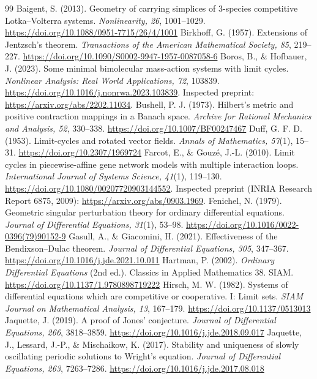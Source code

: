 \begin{thebibliography}{99}
 Baigent, S. (2013). Geometry of carrying simplices of 3-species competitive Lotka--Volterra systems. \emph{Nonlinearity, 26}, 1001--1029. \url{https://doi.org/10.1088/0951-7715/26/4/1001}
 Birkhoff, G. (1957). Extensions of Jentzsch's theorem. \emph{Transactions of the American Mathematical Society, 85}, 219--227. \url{https://doi.org/10.1090/S0002-9947-1957-0087058-6}
 Boros, B., \& Hofbauer, J. (2023). Some minimal bimolecular mass-action systems with limit cycles. \emph{Nonlinear Analysis: Real World Applications, 72}, 103839. \url{https://doi.org/10.1016/j.nonrwa.2023.103839}. Inspected preprint: \url{https://arxiv.org/abs/2202.11034}.
 Bushell, P. J. (1973). Hilbert's metric and positive contraction mappings in a Banach space. \emph{Archive for Rational Mechanics and Analysis, 52}, 330--338. \url{https://doi.org/10.1007/BF00247467}
 Duff, G. F. D. (1953). Limit-cycles and rotated vector fields. \emph{Annals of Mathematics, 57}(1), 15--31. \url{https://doi.org/10.2307/1969724}
 Farcot, E., \& Gouz\'e, J.-L. (2010). Limit cycles in piecewise-affine gene network models with multiple interaction loops. \emph{International Journal of Systems Science, 41}(1), 119--130. \url{https://doi.org/10.1080/00207720903144552}. Inspected preprint (INRIA Research Report 6875, 2009): \url{https://arxiv.org/abs/0903.1969}.
 Fenichel, N. (1979). Geometric singular perturbation theory for ordinary differential equations. \emph{Journal of Differential Equations, 31}(1), 53--98. \url{https://doi.org/10.1016/0022-0396(79)90152-9}
 Gasull, A., \& Giacomini, H. (2021). Effectiveness of the Bendixson--Dulac theorem. \emph{Journal of Differential Equations, 305}, 347--367. \url{https://doi.org/10.1016/j.jde.2021.10.011}
 Hartman, P. (2002). \emph{Ordinary Differential Equations} (2nd ed.). Classics in Applied Mathematics 38. SIAM. \url{https://doi.org/10.1137/1.9780898719222}
 Hirsch, M. W. (1982). Systems of differential equations which are competitive or cooperative. I: Limit sets. \emph{SIAM Journal on Mathematical Analysis, 13}, 167--179. \url{https://doi.org/10.1137/0513013}
 Jaquette, J. (2019). A proof of Jones' conjecture. \emph{Journal of Differential Equations, 266}, 3818--3859. \url{https://doi.org/10.1016/j.jde.2018.09.017}
 Jaquette, J., Lessard, J.-P., \& Mischaikow, K. (2017). Stability and uniqueness of slowly oscillating periodic solutions to Wright's equation. \emph{Journal of Differential Equations, 263}, 7263--7286. \url{https://doi.org/10.1016/j.jde.2017.08.018}

\end{thebibliography}
